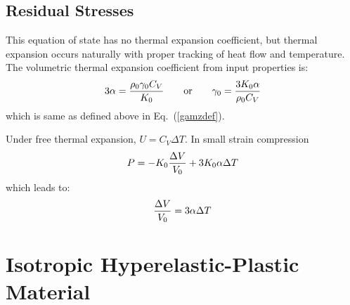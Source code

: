 \documentclass[11pt]{book}
\begin{document}
\subsection{Residual Stresses}

This equation of state has no thermal expansion coefficient, but thermal expansion occurs naturally with proper tracking of heat flow and temperature. The volumetric thermal expansion coefficient from input properties is:
\begin{equation}
     3\alpha = {\rho_0 \gamma_0 C_V\over K_0} \qquad{\rm or}\qquad \gamma_0 = {3K_0\alpha\over \rho_0 C_V}
\end{equation}
which is same as defined above in Eq.~(\ref{gamzdef}).

Under free thermal expansion, $U = C_V\Delta T$. In small strain compression
\begin{equation}
      P = -K_0{\Delta V\over V_0} + 3K_0\alpha \Delta T
\end{equation}
which leads to:
\begin{equation}
   {\Delta V\over V_0} = 3\alpha \Delta T
\end{equation}

\section{Isotropic Hyperelastic-Plastic Material}
\end{document}
